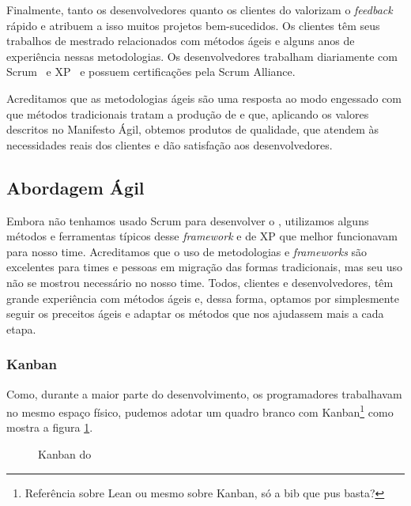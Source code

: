 Finalmente, tanto os desenvolvedores quanto os clientes do \calopsita{} valorizam o \textit{feedback} rápido e atribuem a isso muitos projetos bem-sucedidos. Os clientes têm seus trabalhos de mestrado relacionados com métodos ágeis e alguns anos de experiência nessas metodologias. Os desenvolvedores trabalham diariamente com Scrum~\cite{scrum} e XP~\cite{xp} e possuem certificações pela Scrum Alliance. 

Acreditamos que as metodologias ágeis são uma resposta ao modo engessado com que métodos tradicionais tratam a produção de \software{} e que, aplicando os valores descritos no Manifesto Ágil, obtemos produtos de qualidade, que atendem às necessidades reais dos clientes e dão satisfação aos desenvolvedores.  

\subsection{Abordagem Ágil}

Embora não tenhamos usado Scrum para desenvolver o \calopsita{}, utilizamos alguns métodos e ferramentas típicos desse \textit{framework} e de XP que melhor funcionavam para nosso time. Acreditamos que o uso de metodologias e \textit{frameworks} são excelentes para times e pessoas em migração das formas tradicionais, mas seu uso não se mostrou necessário no nosso time. Todos, clientes e desenvolvedores, têm grande experiência com métodos ágeis e, dessa forma, optamos por simplesmente seguir os preceitos ágeis e adaptar os métodos que nos ajudassem mais a cada etapa. 

\subsubsection*{Kanban~\cite{kanban}}

Como, durante a maior parte do desenvolvimento, os programadores trabalhavam no mesmo espaço físico, pudemos adotar um quadro branco com Kanban\footnote{Referência sobre Lean ou mesmo sobre Kanban, só a bib que pus basta?} como mostra a figura \ref{figura:kanban}.

\begin{figure}[H]
  \centering
  \caption{Kanban do \calopsita{}}\label{figura:kanban}
\end{figure}

